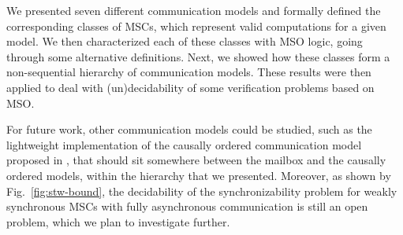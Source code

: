 We presented seven different communication models and formally defined the corresponding classes of MSCs, which represent valid computations for a given model. We then characterized each of these classes with MSO logic, going through some alternative definitions. Next, we showed how these classes form a non-sequential hierarchy of communication models. These results were then applied to deal with (un)decidability of some verification problems based on MSO. 

For future work, other communication models could be studied, such as the lightweight implementation of the causally ordered communication model proposed in \cite{DBLP:conf/dagstuhl/MatternF94}, that should sit somewhere between the mailbox and the causally ordered models, within the hierarchy that we presented. Moreover, as shown by Fig.~\ref{fig:stw-bound}, the decidability of the synchronizability problem for weakly synchronous MSCs with fully asynchronous communication is still an open problem, which we plan to investigate further.